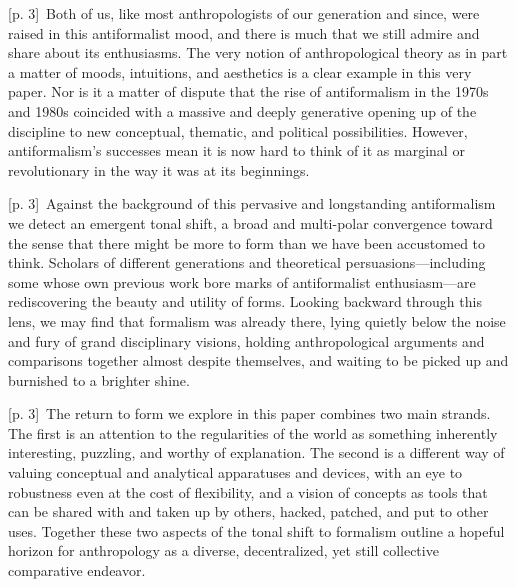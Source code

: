 \documentclass[10pt,a4paper]{article}
\begin{document}
{\scriptsize\color{gray} [p. 3]}\ Both of us, like most anthropologists of our generation and since, were raised in this antiformalist mood, and there is much that we still admire and share about its enthusiasms. The very notion of anthropological theory as in part a matter of moods, intuitions, and aesthetics is a clear example in this very paper. Nor is it a matter of dispute that the rise of antiformalism in the 1970s and 1980s coincided with a massive and deeply generative opening up of the discipline to new conceptual, thematic, and political possibilities. However, antiformalism’s successes mean it is now hard to think of it as marginal or revolutionary in the way it was at its beginnings.\par
{\scriptsize\color{gray} [p. 3]}\ Against the background of this pervasive and longstanding antiformalism we detect an emergent tonal shift, a broad and multi-polar convergence toward the sense that there might be more to form than we have been accustomed to think. Scholars of different generations and theoretical persuasions—including some whose own previous work bore marks of antiformalist enthusiasm—are rediscovering the beauty and utility of forms. Looking backward through this lens, we may find that formalism was already there, lying quietly below the noise and fury of grand disciplinary visions, holding anthropological arguments and comparisons together almost despite themselves, and waiting to be picked up and burnished to a brighter shine.\par
{\scriptsize\color{gray} [p. 3]}\ The return to form we explore in this paper combines two main strands. The first is an attention to the regularities of the world as something inherently interesting, puzzling, and worthy of explanation. The second is a different way of valuing conceptual and analytical apparatuses and devices, with an eye to robustness even at the cost of flexibility, and a vision of concepts as tools that can be shared with and taken up by others, hacked, patched, and put to other uses. Together these two aspects of the tonal shift to formalism outline a hopeful horizon for anthropology as a diverse, decentralized, yet still collective comparative endeavor.\par
\end{document}
